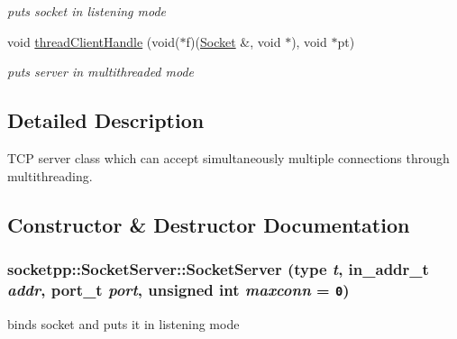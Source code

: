 \begin{CompactItemize}
\begin{CompactList}\small\item\em puts socket in listening mode \item\end{CompactList}\item 
void \hyperlink{classsocketpp_1_1SocketServer_0ded92a6348a6cf953d9f646fac43ac2}{threadClientHandle} (void($\ast$f)(\hyperlink{classsocketpp_1_1Socket}{Socket} \&, void $\ast$), void $\ast$pt)
\begin{CompactList}\small\item\em puts server in multithreaded mode \item\end{CompactList}\end{CompactItemize}


\subsection{Detailed Description}
TCP server class which can accept simultaneously multiple connections through multithreading. 

\subsection{Constructor \& Destructor Documentation}
\hypertarget{classsocketpp_1_1SocketServer_73c5125f9e5a6cf03dc15f6d4250e345}{
\subsubsection[{SocketServer}]{\setlength{\rightskip}{0pt plus 5cm}socketpp::SocketServer::SocketServer (type {\em t}, \/  in\_\-addr\_\-t {\em addr}, \/  port\_\-t {\em port}, \/  unsigned int {\em maxconn} = {\tt 0})}}
\label{classsocketpp_1_1SocketServer_73c5125f9e5a6cf03dc15f6d4250e345}


binds socket and puts it in listening mode 

